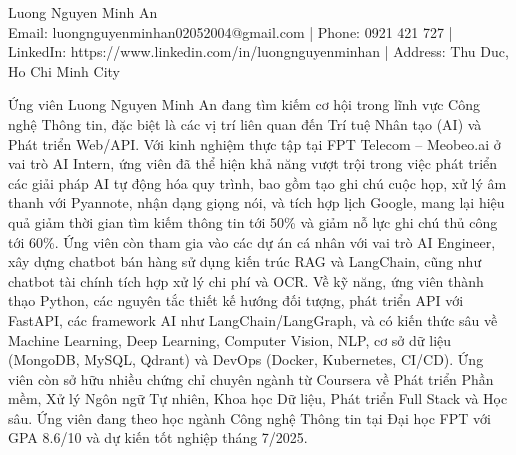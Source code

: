 \documentclass[letterpaper, 11pt]{article}
\newcommand{\sectiontitle}[1]{\vspace{0.1in}\noindent{\Large\color{primary} #1}\vspace{0.05in}\hrulefill}
\begin{document}
\pagestyle{empty} %

\begin{center}
    {\Huge \color{primary} Luong Nguyen Minh An} \\
    \vspace{0.05in}
    \small
    \color{text}
    Email: luongnguyenminhan02052004@gmail.com | Phone: 0921 421 727 | LinkedIn: https://www.linkedin.com/in/luongnguyenminhan | Address: Thu Duc, Ho Chi Minh City
\end{center}

\sectiontitle{Summary}
Ứng vi\^{e}n Luong Nguyen Minh An đang t\`{i}m kiếm cơ hội trong lĩnh vực C\^{o}ng nghệ Th\^{o}ng tin, đặc biệt l\`{a} c\'{a}c vị tr\'{i} li\^{e}n quan đến Tr\'{i} tuệ Nh\^{a}n tạo (AI) v\`{a} Ph\'{a}t triển Web/API. Với kinh nghiệm thực tập tại FPT Telecom -- Meobeo.ai ở vai tr\`{o} AI Intern, ứng vi\^{e}n đ\~{a} thể hiện khả năng vượt trội trong việc ph\'{a}t triển c\'{a}c giải ph\'{a}p AI tự động h\'{o}a quy tr\`{i}nh, bao gồm tạo ghi ch\'{u} cuộc họp, xử lý \^{a}m thanh với Pyannote, nhận dạng giọng n\'{o}i, v\`{a} t\'{i}ch hợp lịch Google, mang lại hiệu quả giảm thời gian t\`{i}m kiếm th\^{o}ng tin tới 50\% v\`{a} giảm nỗ lực ghi ch\'{u} thủ c\^{o}ng tới 60\%. Ứng vi\^{e}n c\`{o}n tham gia v\`{a}o c\'{a}c dự \'{a}n c\'{a} nh\^{a}n với vai tr\`{o} AI Engineer, x\^{a}y dựng chatbot b\'{a}n h\`{a}ng sử dụng kiến tr\'{u}c RAG v\`{a} LangChain, cũng như chatbot t\`{a}i ch\'{i}nh t\'{i}ch hợp xử lý chi ph\'{i} v\`{a} OCR. Về kỹ năng, ứng vi\^{e}n th\`{a}nh thạo Python, c\'{a}c nguy\^{e}n tắc thiết kế hướng đối tượng, ph\'{a}t triển API với FastAPI, c\'{a}c framework AI như LangChain/LangGraph, v\`{a} c\'{o} kiến thức s\^{a}u về Machine Learning, Deep Learning, Computer Vision, NLP, cơ sở dữ liệu (MongoDB, MySQL, Qdrant) v\`{a} DevOps (Docker, Kubernetes, CI/CD). Ứng vi\^{e}n c\`{o}n sở hữu nhiều chứng chỉ chuy\^{e}n ng\`{a}nh từ Coursera về Ph\'{a}t triển Phần mềm, Xử lý Ng\^{o}n ngữ Tự nhi\^{e}n, Khoa học Dữ liệu, Ph\'{a}t triển Full Stack v\`{a} Học s\^{a}u. Ứng vi\^{e}n đang theo học ng\`{a}nh C\^{o}ng nghệ Th\^{o}ng tin tại Đại học FPT với GPA 8.6/10 v\`{a} dự kiến tốt nghiệp th\'{a}ng 7/2025.
\end{document}
